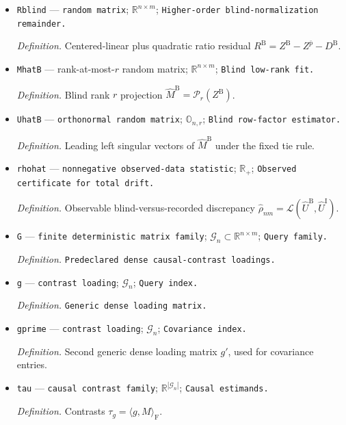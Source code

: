 \documentclass{article}
\begin{document}
\begin{itemize}
  \item \texttt{Rblind} --- \texttt{random matrix}; \(\mathbb R^{n\times m}\); \texttt{Higher-\allowbreak{}order blind-\allowbreak{}normalization remainder.}
  \par\smallskip\noindent\emph{Definition.} Centered-linear plus quadratic ratio residual \(R^{\mathrm B}=Z^{\mathrm B}-Z^{\bar p}-D^{\mathrm B}\).
  \item \texttt{MhatB} --- rank-at-most-\(r\) random matrix; \(\mathbb R^{n\times m}\); \texttt{Blind low-\allowbreak{}rank fit.}
  \par\smallskip\noindent\emph{Definition.} Blind rank \(r\) projection \(\widehat M^{\mathrm B}=\mathcal P_r(Z^{\mathrm B})\).
  \item \texttt{UhatB} --- \texttt{orthonormal random matrix}; \(\mathbb O_{n,r}\); \texttt{Blind row-\allowbreak{}factor estimator.}
  \par\smallskip\noindent\emph{Definition.} Leading left singular vectors of \(\widehat M^{\mathrm B}\) under the fixed tie rule.
  \item \texttt{rhohat} --- \texttt{nonnegative observed-\allowbreak{}data statistic}; \(\mathbb R_+\); \texttt{Observed certificate for total drift.}
  \par\smallskip\noindent\emph{Definition.} Observable blind-versus-recorded discrepancy \(\widehat\rho_{nm}=\mathcal L(\widehat U^{\mathrm B},\widehat U^{\mathrm I})\).
  \item \texttt{G} --- \texttt{finite deterministic matrix family}; \(\mathcal G_n\subset\mathbb R^{n\times m}\); \texttt{Query family.}
  \par\smallskip\noindent\emph{Definition.} \texttt{Predeclared dense causal-\allowbreak{}contrast loadings.}
  \item \texttt{g} --- \texttt{contrast loading}; \(\mathcal G_n\); \texttt{Query index.}
  \par\smallskip\noindent\emph{Definition.} \texttt{Generic dense loading matrix.}
  \item \texttt{gprime} --- \texttt{contrast loading}; \(\mathcal G_n\); \texttt{Covariance index.}
  \par\smallskip\noindent\emph{Definition.} Second generic dense loading matrix \(g'\), used for covariance entries.
  \item \texttt{tau} --- \texttt{causal contrast family}; \(\mathbb R^{|\mathcal G_n|}\); \texttt{Causal estimands.}
  \par\smallskip\noindent\emph{Definition.} Contrasts \(\tau_g=\langle g,M\rangle_{\mathrm F}\).

\end{itemize}
\end{document}
